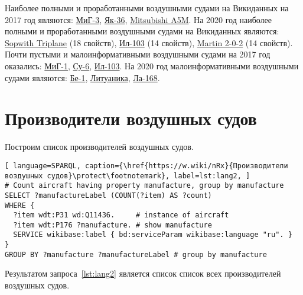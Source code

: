 Наиболее полными и проработанными воздушными судами на Викиданных на 2017 год являются: \href{https://www.wikidata.org/wiki/Q271446}{МиГ-3}, \href{https://www.wikidata.org/wiki/Q1349098}{Як-36}, \href{https://www.wikidata.org/wiki/Q429839}{Mitsubishi A5M}. На 2020 год наиболее полными и проработанными воздушными судами на Викиданных являются: \href{https://www.wikidata.org/wiki/Q770863}{Sopwith Triplane} (18 свойств), \href{https://www.wikidata.org/wiki/Q1658673}{Ил-103} (14 свойств), \href{https://www.wikidata.org/wiki/Q665071}{Martin 2-0-2} (14 свойств).
Почти пустыми и малоинформативными воздушными судами на 2017 год оказались: \href{https://www.wikidata.org/wiki/Q464247}{МиГ-1}, \href{https://www.wikidata.org/wiki/Q2296502}{Су-6}, \href{https://www.wikidata.org/wiki/Q1658673}{Ил-103}.
На 2020 год малоинформативными воздушными судами являются: \href{https://www.wikidata.org/wiki/Q820603}{Бе-1}, \href{https://www.wikidata.org/wiki/Q117984}{Литуаника}, \href{https://www.wikidata.org/wiki/Q572762}{Ла-168}.

\section{Производители воздушных судов}

Построим список производителей воздушных судов.

\begin{lstlisting}[ language=SPARQL, caption={\href{https://w.wiki/nRx}{Производители воздушных судов}\protect\footnotemark}, label=lst:lang2, ]
# Count aircraft having property manufacture, group by manufacture
SELECT ?manufactureLabel (COUNT(?item) AS ?count) 
WHERE {
  ?item wdt:P31 wd:Q11436.     # instance of aircraft
  ?item wdt:P176 ?manufacture. # show manufacture
  SERVICE wikibase:label { bd:serviceParam wikibase:language "ru". }
}
GROUP BY ?manufacture ?manufactureLabel # group by manufacture
\end{lstlisting}

Результатом запроса~\ref{lst:lang2} является список список всех производителей воздушных судов. 


